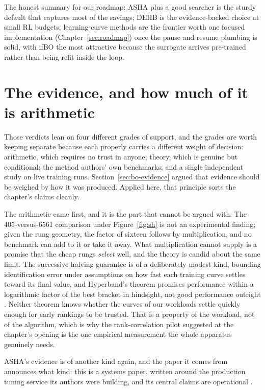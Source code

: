The honest summary for our roadmap: ASHA plus a good searcher is the
sturdy default that captures most of the savings; DEHB is the
evidence-backed choice at small RL budgets; learning-curve methods are
the frontier worth one focused implementation
(Chapter~\ref{sec:roadmap}) once the pause and resume plumbing is
solid, with ifBO the most attractive because the surrogate arrives
pre-trained rather than being refit inside the loop.

\section{The evidence, and how much of it is arithmetic}
\label{sec:mf-evidence}

Those verdicts lean on four different grades of support, and the
grades are worth keeping separate because each properly carries a
different weight of decision: arithmetic, which requires no trust in
anyone; theory, which is genuine but conditional; the method authors'
own benchmarks; and a single independent study on live training runs.
Section~\ref{sec:bo-evidence} argued that evidence should be weighed
by how it was produced. Applied here, that principle sorts the
chapter's claims cleanly.

The arithmetic came first, and it is the part that cannot be argued
with. The 405-versus-6561 comparison under Figure~\ref{fig:sh} is not
an experimental finding; given the rung geometry, the factor of
sixteen follows by multiplication, and no benchmark can add to it or
take it away. What multiplication cannot supply is a promise that the
cheap rungs \emph{select} well, and the theory is candid about the
same limit. The successive-halving guarantee is of a deliberately
modest kind, bounding identification error under assumptions on how
fast each training curve settles toward its final value, and
Hyperband's theorem promises performance within a logarithmic factor
of the best bracket in hindsight, not good performance outright
\citep{jamieson2016successive, li2018hyperband}. Neither theorem knows
whether the curves of our workloads settle quickly enough for early
rankings to be trusted. That is a property of the workload, not of
the algorithm, which is why the rank-correlation pilot suggested at
the chapter's opening is the one empirical measurement the whole
apparatus genuinely needs.

ASHA's evidence is of another kind again, and the paper it comes from
announces what kind: this is a systems paper, written around the
production tuning service its authors were building, and its central
claims are operational \citep{li2020asha}.

